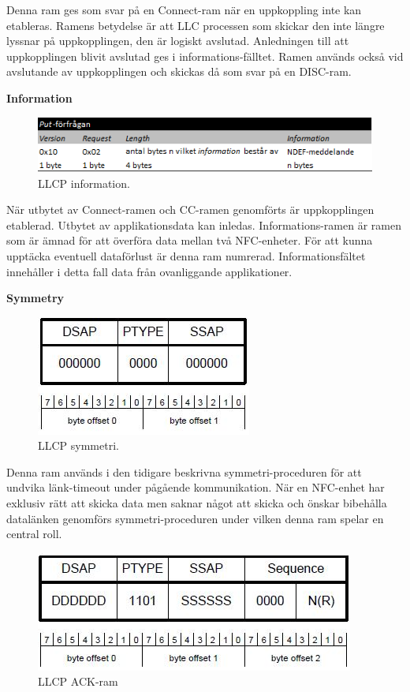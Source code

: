 \documentclass[11pt]{article}
\begin{document}
Denna ram ges som svar på en Connect-ram när en uppkoppling inte kan etableras. Ramens betydelse är att LLC processen som skickar den inte längre lyssnar på uppkopplingen, den är logiskt avslutad. Anledningen till att uppkopplingen blivit avslutad ges i informations-fälltet. Ramen används också vid avslutande av uppkopplingen och skickas då som svar på en DISC-ram.

\textbf{Information}

\begin{figure}[H]
\centering
\includegraphics[scale=0.7]{LLCP_information.png}
\caption{LLCP information.}
\label{fig:LLCP_information}
\end{figure}

När utbytet av Connect-ramen och CC-ramen genomförts är uppkopplingen etablerad. Utbytet av applikationsdata kan inledas. Informations-ramen är ramen som är ämnad för att överföra data mellan två NFC-enheter. För att kunna upptäcka eventuell dataförlust är denna ram numrerad. Informationsfältet innehåller i detta fall data från ovanliggande applikationer.

\textbf{Symmetry}

\begin{figure}[H]
\centering
\includegraphics[scale=0.8]{LLCP_symmetri.jpg}
\caption{LLCP symmetri.}
\label{fig:LLCP_symmetri}
\end{figure}

Denna ram används i den tidigare beskrivna symmetri-proceduren för att undvika länk-timeout under pågående kommunikation. När en NFC-enhet har exklusiv rätt att skicka data men saknar något att skicka och önskar bibehålla datalänken genomförs symmetri-proceduren under vilken denna ram spelar en central roll.

\begin{figure}[H]
\centering
\includegraphics[scale=0.8]{LLCP_ack.jpg}
\caption{LLCP ACK-ram}
\label{fig:LLCP_ack}
\end{figure}
\end{document}
